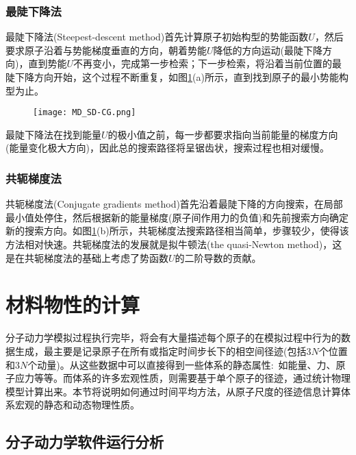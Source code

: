 \subsubsection{最陡下降法}
最陡下降法\textrm{(Steepest-descent method)}首先计算原子初始构型的势能函数$U$，然后要求原子沿着与势能梯度垂直的方向，朝着势能$U$降低的方向运动(最陡下降方向)，直到势能$U$不再变小，完成第一步检索；下一步检索，将沿着当前位置的最陡下降方向开始，这个过程不断重复，如图\ref{MD_SD-CG}\textrm{(a)}所示，直到找到原子的最小势能构型为止。
\begin{figure}[h!]
\centering
\vspace*{-0.1in}
\texttt{[image: MD\_SD-CG.png]}
\caption{\fontsize{7.2pt}{4.2pt}}%
\label{MD_SD-CG}
\end{figure}
最陡下降法在找到能量$U$的极小值之前，每一步都要求指向当前能量的梯度方向(能量变化极大方向)，因此总的搜索路径将呈锯齿状，搜索过程也相对缓慢。
\subsubsection{共轭梯度法}
共轭梯度法\textrm{(Conjugate gradients method)}首先沿着最陡下降的方向搜索，在局部最小值处停住，然后根据新的能量梯度(原子间作用力的负值)和先前搜索方向确定新的搜索方向。如图\ref{MD_SD-CG}(b)所示，共轭梯度法搜索路径相当简单，步骤较少，使得该方法相对快速。共轭梯度法的发展就是拟牛顿法\textrm{(the quasi-Newton method)}，这是在共轭梯度法的基础上考虑了势函数$U$的二阶导数的贡献。

\section{材料物性的计算}
分子动力学模拟过程执行完毕，将会有大量描述每个原子的在模拟过程中行为的数据生成，最主要是记录原子在所有或指定时间步长下的相空间径迹(包括3$N$个位置和3$N$个动量)。从这些数据中可以直接得到一些体系的静态属性:~如能量、力、原子应力等等。而体系的许多宏观性质，则需要基于单个原子的径迹，通过统计物理模型计算出来。本节将说明如何通过时间平均方法，从原子尺度的径迹信息计算体系宏观的静态和动态物理性质。
\subsection{分子动力学软件运行分析}

